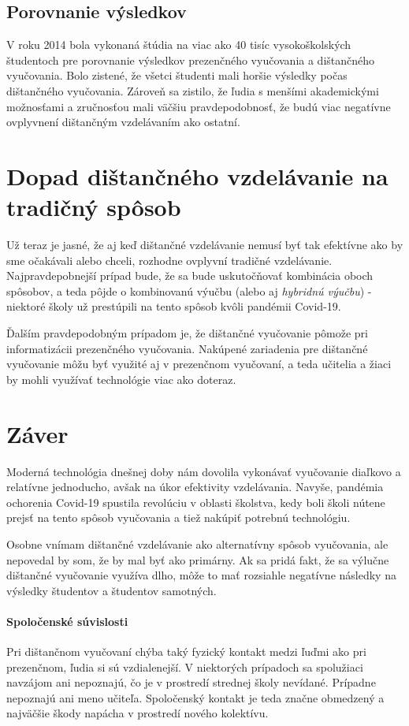 \documentclass[10pt,twoside,slovak,a4paper]{article}
\begin{document}
\subsection{Porovnanie výsledkov}
V roku 2014 bola vykonaná štúdia na viac ako 40 tisíc vysokoškolských študentoch pre porovnanie výsledkov prezenčného vyučovania a dištančného vyučovania. Bolo zistené, že všetci študenti mali horšie výsledky počas dištančného vyučovania. Zároveň sa zistilo, že ľudia s menšími akademickými možnosťami a zručnosťou mali väčšiu pravdepodobnosť, že budú viac negatívne ovplyvnení dištančným vzdelávaním ako ostatní\cite{Zimmerman:Experiment}.

\section{Dopad dištančného vzdelávanie na tradičný spôsob} \label{dopad}
Už teraz je jasné, že aj keď dištančné vzdelávanie nemusí byť tak efektívne ako by sme očakávali alebo chceli, rozhodne ovplyvní tradičné vzdelávanie. Najpravdepobnejší prípad bude, že sa bude uskutočňovať kombinácia oboch spôsobov, a teda pôjde o kombinovanú výučbu (alebo aj \textit{hybridnú výučbu}) - niektoré školy už prestúpili na tento spôsob kvôli pandémii Covid-19\cite{Zimmerman:Experiment}\cite{Ahmed:Model}.

Ďalším pravdepodobným prípadom je, že dištančné vyučovanie pômože pri informatizácii prezenčného vyučovania. Nakúpené zariadenia pre dištančné vyučovanie môžu byť využité aj v prezenčnom vyučovaní, a teda učitelia a žiaci by mohli využívať technológie viac ako doteraz.

\section{Záver} \label{zaver}
Moderná technológia dnešnej doby nám dovolila vykonávať vyučovanie diaľkovo a relatívne jednoducho, avšak na úkor efektivity vzdelávania. Navyše, pandémia ochorenia Covid-19 spustila revolúciu v oblasti školstva, kedy boli školi nútene prejsť na tento spôsob vyučovania a tiež nakúpiť potrebnú technológiu.

Osobne vnímam dištančné vzdelávanie ako alternatívny spôsob vyučovania, ale nepovedal by som, že by mal byť ako primárny. Ak sa pridá fakt, že sa výlučne dištančné vyučovanie využíva dlho, môže to mať rozsiahle negatívne následky na výsledky študentov a študentov samotných.

\paragraph{Spoločenské súvislosti}
Pri dištančnom vyučovaní chýba taký fyzický kontakt medzi ľuďmi ako pri prezenčnom, ľudia si sú vzdialenejší. V niektorých prípadoch sa spolužiaci navzájom ani nepoznajú, čo je v prostredí strednej školy nevídané. Prípadne nepoznajú ani meno učiteľa. Spoločenský kontakt je teda značne obmedzený a najväčšie škody napácha v prostredí nového kolektívu.
\end{document}
